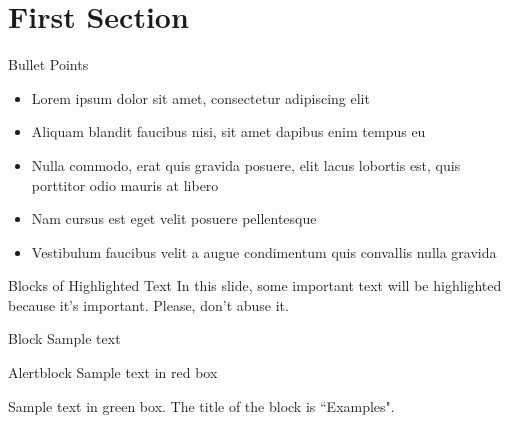 \section{First Section}

\begin{frame}{Bullet Points}
    \begin{itemize}
        \item Lorem ipsum dolor sit amet, consectetur adipiscing elit
        \item Aliquam blandit faucibus nisi, sit amet dapibus enim tempus eu
        \item Nulla commodo, erat quis gravida posuere, elit lacus lobortis est, quis porttitor odio mauris at libero
        \item Nam cursus est eget velit posuere pellentesque
        \item Vestibulum faucibus velit a augue condimentum quis convallis nulla gravida
    \end{itemize}
\end{frame}


\begin{frame}{Blocks of Highlighted Text}
    In this slide, some important text will be \alert{highlighted} because it's important. Please, don't abuse it.

    \begin{block}{Block}
        Sample text
    \end{block}

    \begin{alertblock}{Alertblock}
        Sample text in red box
    \end{alertblock}

    \begin{examples}
        Sample text in green box. The title of the block is ``Examples".
    \end{examples}
\end{frame}


